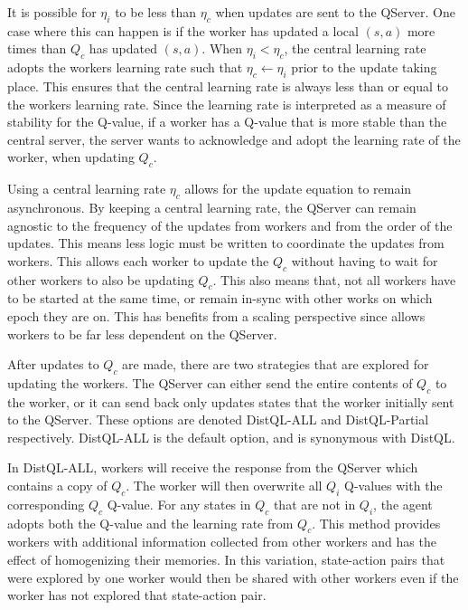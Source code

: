 \documentclass[jair,twoside,11pt,theapa]{article}
\begin{document}
It is possible for $\eta_i$ to be less than $\eta_c$ when updates are sent to the QServer. One case where this can happen is if the worker has updated a local $(s,a)$ more times than $Q_c$ has updated $(s,a)$. When $\eta_i < \eta_c$, the central learning rate adopts the workers learning rate such that $\eta_c \leftarrow \eta_i$ prior to the update taking place. This ensures that the central learning rate is always less than or equal to the workers learning rate. Since the learning rate is interpreted as a measure of stability for the Q-value, if a worker has a Q-value that is more stable than the central server, the server wants to acknowledge and adopt the learning rate of the worker, when updating $Q_c$.


Using a central learning rate $\eta_c$ allows for the update equation to remain asynchronous. By keeping a central learning rate, the QServer can remain agnostic to the frequency of the updates from workers and from the order of the updates. This means less logic must be written to coordinate the updates from workers. This allows each worker to update the $Q_c$ without having to wait for other workers to also be updating $Q_c$. This also means that, not all workers have to be started at the same time, or remain in-sync with other works on which epoch they are on. This has benefits from a scaling perspective since allows workers to be far less dependent on the QServer. 

After updates to $Q_c$ are made, there are two strategies that are explored for updating the workers. The QServer can either send the entire contents of $Q_c$ to the worker, or it can send back only updates states that the worker initially sent to the QServer. These options are denoted DistQL-ALL and DistQL-Partial respectively. DistQL-ALL is the default option, and is synonymous with DistQL. 

In DistQL-ALL, workers will receive the response from the QServer which contains a copy of $Q_c$. The worker will then overwrite all $Q_i$ Q-values with the corresponding $Q_c$ Q-value. For any states in $Q_c$ that are not in $Q_i$, the agent adopts both the Q-value and the learning rate from $Q_c$. This method provides workers with additional information collected from other workers and has the effect of homogenizing their memories. In this variation, state-action pairs that were explored by one worker would then be shared with other workers even if the worker has not explored that state-action pair.
\end{document}
